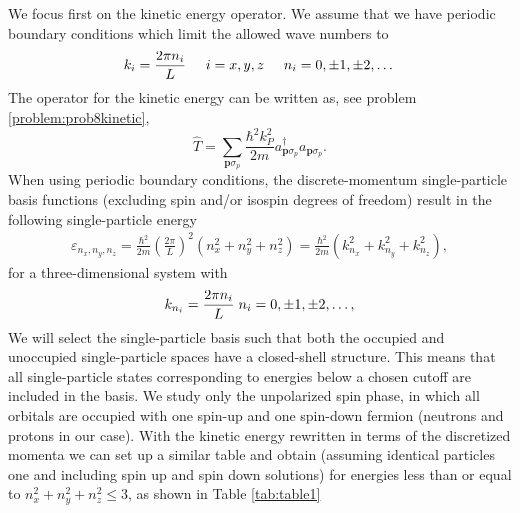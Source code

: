 We focus first on the kinetic energy operator.  We assume that we have
periodic boundary conditions which limit the allowed wave numbers to
\[
k_i=\frac{2\pi n_i}{L}\hspace{0.5cm} i=x,y,z \hspace{0.5cm} n_i=0,\pm
1,\pm 2, \dots
\]
The operator for the kinetic energy can be written as, see problem
\ref{problem:prob8kinetic},
\[
\hat{T}=\sum_{\mathbf{p}\sigma_p}\frac{\hbar^2k_P^2}{2m}a_{\mathbf{p}\sigma_p}^{\dagger}a_{\mathbf{p}\sigma_p}.
\]
When using periodic boundary conditions, the discrete-momentum
single-particle basis functions (excluding spin and/or isospin degrees
of freedom) result in the following single-particle energy
\begin{align}
  \varepsilon_{n_{x}, n_{y}, n_{z}} = \frac{\hbar^{2}}{2m} \left(
  \frac{2\pi }{L}\right)^{2} \left( n_{x}^{2} + n_{y}^{2} +
  n_{z}^{2}\right)=\frac{\hbar^2}{2m}\left(k_{n_x}^2+k_{n_y}^2+k_{n_z}^2\right),
\end{align} 
for a three-dimensional system with
\[
k_{n_i}=\frac{2\pi n_i}{L} \hspace{0.1cm} n_i = 0, \pm 1, \pm 2,
\dots,
\]
We will select the single-particle basis such that both the occupied
and unoccupied single-particle spaces have a closed-shell
structure. This means that all single-particle states corresponding to
energies below a chosen cutoff are included in the basis. We study
only the unpolarized spin phase, in which all orbitals are occupied
with one spin-up and one spin-down fermion (neutrons and protons in
our case).  With the kinetic energy rewritten in terms of the
discretized momenta we can set up a similar table and obtain (assuming
identical particles one and including spin up and spin down solutions)
for energies less than or equal to $n_{x}^{2}+n_{y}^{2}+n_{z}^{2}\le
3$, as shown in Table \ref{tab:table1}
